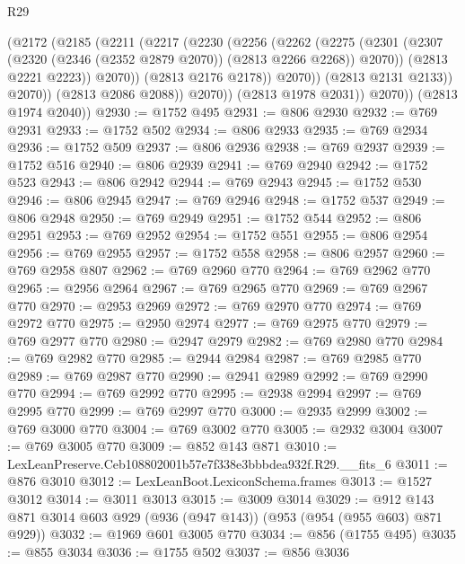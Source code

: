 \begin{lexlean}{R29}
\begin{coremodule}
                    (@2172
                      (@2185
                        (@2211
                          (@2217
                            (@2230
                              (@2256
                                (@2262
                                  (@2275
                                    (@2301
                                      (@2307
                                        (@2320 (@2346 (@2352 @2879 @2070)) (@2813 @2266 @2268))
                                        @2070))
                                    (@2813 @2221 @2223))
                                  @2070))
                              (@2813 @2176 @2178))
                            @2070))
                        (@2813 @2131 @2133))
                      @2070))
                  (@2813 @2086 @2088))
                @2070))
            (@2813 @1978 @2031))
          @2070))
      (@2813 @1974 @2040))
@2930 := @1752 @495
@2931 := @806 @2930
@2932 := @769 @2931
@2933 := @1752 @502
@2934 := @806 @2933
@2935 := @769 @2934
@2936 := @1752 @509
@2937 := @806 @2936
@2938 := @769 @2937
@2939 := @1752 @516
@2940 := @806 @2939
@2941 := @769 @2940
@2942 := @1752 @523
@2943 := @806 @2942
@2944 := @769 @2943
@2945 := @1752 @530
@2946 := @806 @2945
@2947 := @769 @2946
@2948 := @1752 @537
@2949 := @806 @2948
@2950 := @769 @2949
@2951 := @1752 @544
@2952 := @806 @2951
@2953 := @769 @2952
@2954 := @1752 @551
@2955 := @806 @2954
@2956 := @769 @2955
@2957 := @1752 @558
@2958 := @806 @2957
@2960 := @769 @2958 @807
@2962 := @769 @2960 @770
@2964 := @769 @2962 @770
@2965 := @2956 @2964
@2967 := @769 @2965 @770
@2969 := @769 @2967 @770
@2970 := @2953 @2969
@2972 := @769 @2970 @770
@2974 := @769 @2972 @770
@2975 := @2950 @2974
@2977 := @769 @2975 @770
@2979 := @769 @2977 @770
@2980 := @2947 @2979
@2982 := @769 @2980 @770
@2984 := @769 @2982 @770
@2985 := @2944 @2984
@2987 := @769 @2985 @770
@2989 := @769 @2987 @770
@2990 := @2941 @2989
@2992 := @769 @2990 @770
@2994 := @769 @2992 @770
@2995 := @2938 @2994
@2997 := @769 @2995 @770
@2999 := @769 @2997 @770
@3000 := @2935 @2999
@3002 := @769 @3000 @770
@3004 := @769 @3002 @770
@3005 := @2932 @3004
@3007 := @769 @3005 @770
@3009 := @852 @143 @871
@3010 := LexLeanPreserve.Ceb108802001b57e7f338e3bbbdea932f.R29.__fits_6
@3011 := @876 @3010
@3012 := LexLeanBoot.LexiconSchema.frames
@3013 := @1527 @3012
@3014 := @3011 @3013
@3015 := @3009 @3014
@3029 := @912 @143 @871 @3014 @603 @929 (@936 (@947 @143)) (@953 (@954 (@955 @603) @871 @929))
@3032 := @1969 @601 @3005 @770
@3034 := @856 (@1755 @495)
@3035 := @855 @3034
@3036 := @1755 @502
@3037 := @856 @3036

\end{coremodule}
\end{lexlean}

